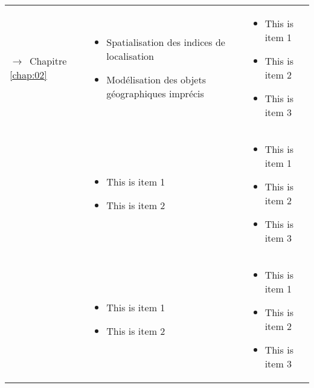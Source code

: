 \begin{tabular}{L{.2\textheight}L{.35\textheight}L{.35\textheight}}
  {\par\footnotesize\hspace{.25cm}$\longrightarrow$~Chapitre \ref{chap:02}}
& \begin{minipage}{.35\textheight}
    \begin{itemize}
    \item Spatialisation des indices de localisation
    \item Modélisation des objets géographiques imprécis
    \end{itemize}
  \end{minipage}& \begin{minipage}{.35\textheight}
    \begin{itemize}
    \item This is item 1
    \item This is item 2
    \item This is item 3
    \end{itemize}
  \end{minipage} \\
& \begin{minipage}{.35\textheight}
    \begin{itemize}
    \item This is item 1
    \item This is item 2
    \end{itemize}
  \end{minipage}& \begin{minipage}{.35\textheight}
    \begin{itemize}
    \item This is item 1
    \item This is item 2
    \item This is item 3
    \end{itemize}
  \end{minipage} \\
& \begin{minipage}{.35\textheight}
    \begin{itemize}
    \item This is item 1
    \item This is item 2
    \end{itemize}
  \end{minipage}& \begin{minipage}{.35\textheight}
    \begin{itemize}
    \item This is item 1
    \item This is item 2
    \item This is item 3
    \end{itemize}
  \end{minipage}\\
  
  \bottomrule
\end{tabular}
